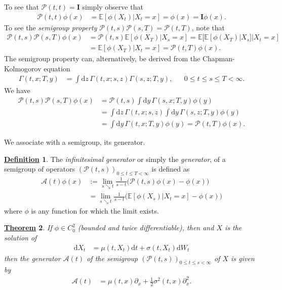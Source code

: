 \documentclass[12pt]{book}
\let\varphi\phi
\numberwithin{equation}{chapter}
\theoremstyle{plain}
\newtheorem{theorem}{\underline{Theorem}}
\numberwithin{theorem}{section}
\theoremstyle{definition}
\newtheorem{definition}[theorem]{\underline{Definition}}
\numberwithin{exercise}{chapter}
\let\oldendproof\endproof
\renewenvironment{proof}[1][\proofname]{%
  \oldproof[\scshape\underline{#1}]%
}{\oldendproof}
\newcommand{\<}{\langle}
\renewcommand{\>}{\rangle}
\renewcommand{\(}{\left(}
\renewcommand{\)}{\right)}
\renewcommand{\[}{\left[}
\renewcommand{\]}{\right]}
\newcommand\Eb{\mathds{E}}
\newcommand\Ac{\mathscr{A}}
\newcommand\Pc{\mathscr{P}}
\newcommand\sig{\sigma}
\newcommand\Gam{\Gamma}
\newcommand\Iv{\pmb{I}}
\renewcommand\d{\partial}
\newcommand\dd{\mathrm{d}}
\begin{document}
\begin{proof}
To see that $\Pc(t,t) = \Iv$ simply observe that
\begin{align}
\Pc(t,t) \varphi(x)
	&=	\Eb[  \varphi(X_t) | X_t = x ] = \varphi(x) = \Iv \varphi(x) .
\end{align}
To see the \emph{semigroup property} $\Pc(t,s) \Pc(s,T) = \Pc(t,T)$, note that
\begin{align}
\Pc(t,s) \Pc(s,T) \varphi(x)
	&=	\Pc(t,s) \Eb[ \varphi(X_T) | X_s = x ]
	=		\Eb[  \Eb[ \varphi(X_T) | X_s ] | X_t = x ] \\
	&=		\Eb [ \varphi(X_T) | X_t = x ]
	=		\Pc(t,T) \varphi(x) .
\end{align}
The semigroup property can, alternatively, be derived from the Chapman-Kolmogorov equation
\begin{align}
\Gam(t,x;T,y)
	&=	\int \dd z \, \Gam(t,x;s,z) \Gam(s,z;T,y) , &
	& 0 \leq t \leq s \leq T < \infty .
\end{align}
We have
\begin{align}
\Pc(t,s) \Pc(s,T) \varphi(x)
	&=	\Pc(t,s) \int \dd y \, \Gam(s,x;T,y) \varphi(y)  \\
	&=	\int \dd z \, \Gam(t,x;s,z) \int \dd y \, \Gam(s,z;T,y) \varphi(y) \\
	&=	\int \dd y \, \Gam(t,x;T,y) \varphi(y) 
	=		\Pc(t,T) \varphi(x) .
\end{align}
\end{proof}

\noindent
We associate with a semigroup, its generator.

\begin{definition}
The \emph{infinitesimal generator} or simply the \emph{generator}, of a semigroup of operators $(\Pc(t,s))_{0 \leq t \leq T < \infty}$ is defined as
\begin{align}
\Ac(t) \varphi(x)
	&:=	\lim_{s \searrow t} \frac{1}{s-t} \Big( \Pc(t,s) \varphi(x) - \varphi(x) \Big) \\
	&=		\lim_{s \searrow t} \frac{1}{s-t} \Big( \Eb[ \varphi(X_s) | X_t = x ] - \varphi(x) \Big)
\end{align}
where $\varphi$ is any function for which the limit exists.
\end{definition}

\begin{theorem}
If $\varphi \in C_0^2$ (bounded and twice differentiable), then and $X$ is the solution of
\begin{align}
\dd X_t
	&=	\mu(t,X_t) \dd t + \sig(t,X_t) \dd W_t
\end{align}
then the generator $\Ac(t)$ of the semigroup $(\Pc(t,s))_{0 \leq t \leq s < \infty}$ of $X$ is given by
\begin{align}
\Ac(t)
	&=	\mu(t,x) \d_x + \tfrac{1}{2} \sig^2(t,x) \d_x^2 .
\end{align}
\end{theorem}
\end{document}
